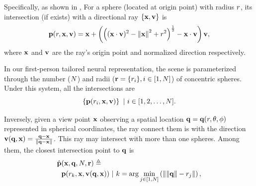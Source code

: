 Specifically, as shown in ,  
For a sphere (located at origin point) with radius $r$, its intersection (if exists) with a directional ray $\{\mathbf{x},\mathbf{v}\}$ is
\begin{equation}
\mathbf{p}(r,\mathbf{x},\mathbf{v}) = \mathbf{x} + \left({\left((\mathbf{x}\cdot\mathbf{v})^2-\left\lVert\mathbf{x}\right\rVert^2+r^2\right)}^{\frac{1}{2}}-\mathbf{x}\cdot\mathbf{v}\right)\mathbf{v},
\end{equation}
where $\mathbf{x}$ and $\mathbf{v}$  are the ray's origin point and normalized direction respectively.

In our first-person tailored neural representation, the scene is parameterized through the number ($N$) and radii ($\mathbf{r}=\{r_i\},i\in [1,N]$) of concentric spheres. Under this system, all the intersections are
\begin{equation}
\left\{\mathbf{p}(r_i,\mathbf{x},\mathbf{v}) \right\}\ |\ i\in[1,2,\dots,N].
\end{equation}

Inversely, given a view point $\mathbf{x}$ observing a spatial location $\mathbf{q}=\mathbf{q}(r, \theta, \phi)$ represented in spherical coordinates, the ray connect them is with the direction $\mathbf{v}(\mathbf{q},\mathbf{x})=\frac{\mathbf{q}-\mathbf{x}}{\left\lVert\mathbf{q}-\mathbf{x}\right\rVert}$. This ray may intersect with more than one spheres. 
Among them, the closest intersection point to $\mathbf{q}$ is
\begin{equation}\label{eq:closestPoint}
\begin{aligned}
    \hat{\mathbf{p}}&(\mathbf{x},\mathbf{q}, N, \mathbf{r}) \triangleq \\
    &\mathbf{p}(r_k,\mathbf{x},\mathbf{v}(\mathbf{q},\mathbf{x}))\ |\ k=\arg\min_{j\in[1,N]}\left(\left\lVert\left\lVert\mathbf{q}\right\rVert-r_j\right\rVert\right),
\end{aligned}
\end{equation}

